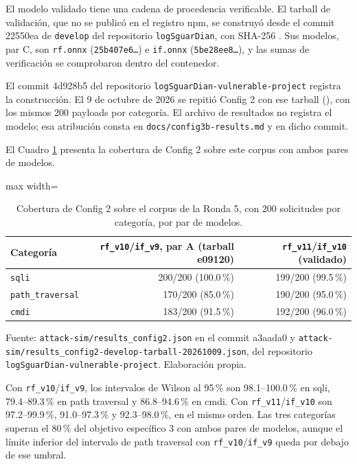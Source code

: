 El modelo validado tiene una cadena de procedencia verificable. El tarball de validación, que no se publicó en el registro npm, se construyó desde el commit 22550ea de \texttt{develop} del repositorio \texttt{logSguarDian}, con SHA-256 \texttt{}. Sus modelos, par C, son \texttt{rf.onnx} (\texttt{25b407e6\ldots}) e \texttt{if.onnx} (\texttt{5be28ee8\ldots}), y las sumas de verificación se comprobaron dentro del contenedor.

El commit 4d928b5 del repositorio \texttt{logSguarDian-vulnerable-project} registra la construcción.  El 9 de octubre de 2026 se repitió Config 2 con ese tarball (), con los mismos 200 payloads por categoría. El archivo de resultados no registra el modelo; esa atribución consta en \texttt{docs/config3b-results.md} y en dicho commit.

El Cuadro \ref{tabla:res-ronda5} presenta la cobertura de Config 2 sobre este corpus con ambos pares de modelos.

\begin{table}[htbp]
\centering
\footnotesize
\setlength{\tabcolsep}{3pt}
\begin{adjustbox}{max width=\linewidth}
\begin{tabular}{|l|r|r|}
\hline
\textbf{Categoría} & \textbf{\texttt{rf\_v10}/\texttt{if\_v9}, par A (tarball e09120\textellipsis{})} & \textbf{\texttt{rf\_v11}/\texttt{if\_v10} (validado)} \\ \hline
\texttt{sqli} & 200/200 (100.0\,\%) & 199/200 (99.5\,\%) \\ \hline
\texttt{path\_traversal} & 170/200 (85.0\,\%) & 190/200 (95.0\,\%) \\ \hline
\texttt{cmdi} & 183/200 (91.5\,\%) & 192/200 (96.0\,\%) \\ \hline
\end{tabular}
\end{adjustbox}
\caption{Cobertura de Config 2 sobre el corpus de la Ronda 5, con 200 solicitudes por categoría, por par de modelos.}
\label{tabla:res-ronda5}
\par\smallskip\footnotesize Fuente: \texttt{attack-sim/results\_config2.json} en el commit a3aada0 y \texttt{attack-sim/results\_config2-develop-tarball-20261009.json}, del repositorio \texttt{logSguarDian-vulnerable-project}. Elaboración propia.
\end{table}

Con \texttt{rf\_v10}/\texttt{if\_v9}, los intervalos de Wilson al 95\,\% son 98.1--100.0\,\% en sqli, 79.4--89.3\,\% en path traversal y 86.8--94.6\,\% en cmdi. Con \texttt{rf\_v11}/\texttt{if\_v10} son 97.2--99.9\,\%, 91.0--97.3\,\% y 92.3--98.0\,\%, en el mismo orden. Las tres categorías superan el 80\,\% del objetivo específico 3 con ambos pares de modelos, aunque el límite inferior del intervalo de path traversal con \texttt{rf\_v10}/\texttt{if\_v9} queda por debajo de ese umbral.

